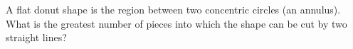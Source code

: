 A flat donut shape is the region between two concentric circles (an annulus). What is the greatest number of pieces into which the shape can be cut by two straight lines?
